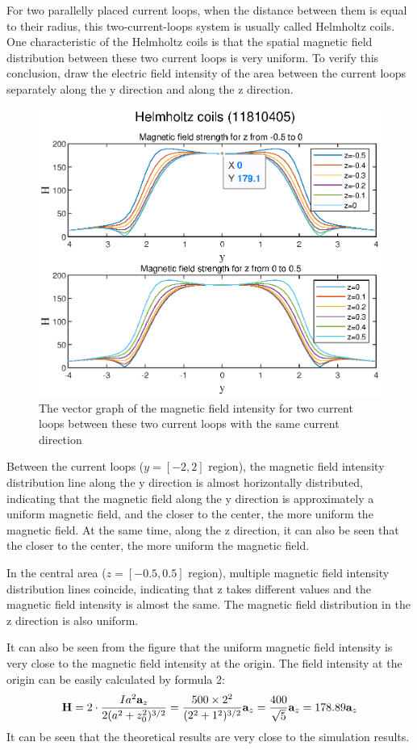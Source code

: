 \documentclass[journal,twocolumn,letterpaper]{IEEEJERM}
\begin{document}
For two parallelly placed current loops, when the distance between them is equal to their radius, this two-current-loops system is usually called Helmholtz coils.\cite{num2}  One characteristic of the Helmholtz coils is that the spatial magnetic field distribution between these two current loops is very uniform. To verify this conclusion,  draw the electric field intensity of the area between the current loops separately along the y direction and along the z direction.
\begin{figure}[H]   
	\centering	        \includegraphics[width=0.9\linewidth]{F3-1.eps}
	\caption{The vector graph of the magnetic field intensity for two current loops  between these two current loops with the same current direction }	  
	\label{fig5} 
\end{figure}
Between the current loops ($ y=[-2,2] $ region), the magnetic field intensity distribution line along the y direction is almost horizontally distributed, indicating that the magnetic field along the y direction is approximately a uniform magnetic field, and the closer to the center, the more uniform the magnetic field. At the same time, along the z direction, it can also be seen that the closer to the center, the more uniform the magnetic field. 

In the central area ($ z =[-0.5,0.5] $ region), multiple magnetic field intensity distribution lines coincide, indicating that z takes different values and the magnetic field intensity is almost the same. The magnetic field distribution in the z direction is also uniform.

It can also be seen from the figure that the uniform magnetic field intensity is very close to the magnetic field intensity at the origin. The field intensity at the origin can be easily calculated by formula 2:
\begin{align}
\mathbf{H}=2\cdot \dfrac{Ia^2\mathbf{a}_z}{2(a^2+z_0^2)^{3/2}}=\dfrac{500\times2^2}{(2^2+1^2)^{3/2}}\mathbf{a}_z=\dfrac{400}{\sqrt{5}}\mathbf{a}_z=178.89\mathbf{a}_z\notag
\end{align}
It can be seen that the theoretical results are very close to the simulation results.
\end{document}
